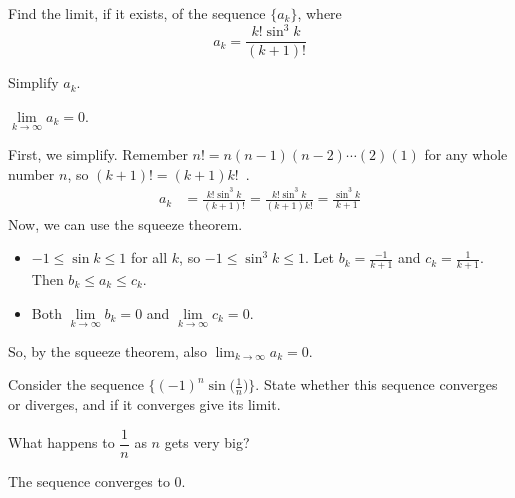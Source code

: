 \begin{question}[M105 2012A]
Find the limit, if it exists, of the sequence $\big\{a_k\big\}$, where
\begin{equation*}
a_k=\frac{k!\sin^3 k}{(k+1)!}
\end{equation*}
\end{question}

\begin{hint}
Simplify $a_k$.
\end{hint}

\begin{answer}
$\lim\limits_{k\rightarrow\infty}a_k= 0$.
\end{answer}

\begin{solution}
First, we simplify.  Remember $n! = n(n-1)(n-2)\cdots(2)(1)$ for any whole number $n$, so $(k+1)!=(k+1)k!$~.
\begin{align*}
a_k&=\frac{k!\sin^3k}{(k+1)!}=\frac{k!\sin^3k}{(k+1)k!} = \frac{\sin^3 k}{k+1}
\end{align*}
Now, we can use the squeeze theorem.
\begin{itemize}
\item $-1 \leq \sin k \leq 1$ for all $k$, so $-1 \leq \sin^3k \leq 1$. Let $b_k = \frac{-1}{k+1}$ and $c_k = \frac{1}{k+1}$. Then $b_k \leq a_k \leq c_k$.
\item Both $\lim\limits_{k \to \infty}b_k=0$ and $\lim\limits_{k \to \infty}c_k=0$.
\end{itemize}
So, by the squeeze theorem, also $\displaystyle\lim_{k\to\infty} a_k=0$.
\end{solution}



\begin{question}[2013A]
Consider the sequence $\Big\{(-1)^n\sin\big(\frac{1}{n}\big)\Big\}$.
State whether this sequence converges or diverges, and if it converges
give its limit.
\end{question}

\begin{hint}
What happens to $\dfrac{1}{n}$ as $n$ gets very big?
\end{hint}

\begin{answer}
The sequence converges to $0$.
\end{answer}

